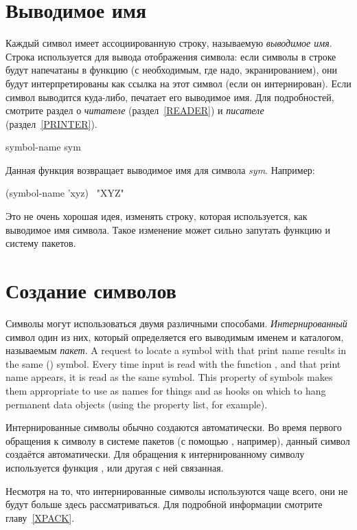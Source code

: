 \section{Выводимое имя}

Каждый символ имеет ассоциированную строку, называемую \emph{выводимое имя}.
Строка используется для вывода отображения символа:
если символы в строке будут напечатаны в функцию  (с необходимым, где
надо, экранированием), они будут интерпретированы как ссылка на этот символ
(если он интернирован). Если символ выводится куда-либо,  печатает
его выводимое имя.
Для подробностей, смотрите раздел о \emph{читателе} (раздел~\ref{READER}) и
\emph{писателе} (раздел~\ref{PRINTER}).

\begin{defun}[Function]
symbol-name sym

Данная функция возвращает выводимое имя для символа \emph{sym}.
Например:
\begin{lisp}
(symbol-name 'xyz) \EV\ "XYZ"
\end{lisp}
Это не очень хорошая идея, изменять строку, которая используется, как выводимое
имя символа. Такое изменение может сильно запутать функцию  и систему
пакетов.
\end{defun}

\section{Создание символов}

Символы могут использоваться двумя различными способами.
\emph{Интернированный} символ один из них, который определяется его выводимым
именем и каталогом, называемым \emph{пакет}.
A request to locate a symbol with that print name results
in the same () symbol.  Every time input is read with the
function ,
and that print name appears, it is read as the same symbol.
This property of symbols makes them appropriate to use as names for
things and as hooks on which to hang permanent data objects
(using the property list, for example).

Интернированные символы обычно создаются автоматически. Во время первого
обращения к символу в системе пакетов (с помощью , например), данный
символ создаётся автоматически. Для обращения к
интернированному символу используется функция , или другая с ней
связанная.

Несмотря на то, что интернированные символы используются чаще всего, они не
будут больше здесь рассматриваться. Для подробной информации смотрите
главу~\ref{XPACK}.

